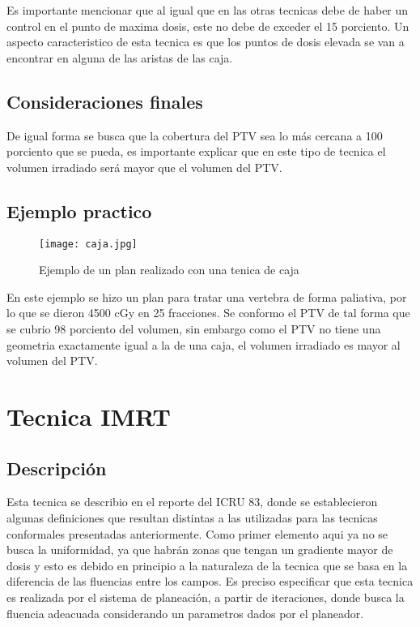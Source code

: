 \documentclass{article}
\begin{document}
\vspace{10pt}

Es importante mencionar que al igual que en las otras tecnicas debe de haber un control en el punto de maxima dosis, este no debe de exceder el 15 porciento. Un aspecto caracteristico de esta tecnica es que los puntos de dosis elevada se van a encontrar en alguna de las aristas de las caja.


\subsection{Consideraciones finales}


De igual forma se busca que la cobertura del PTV sea lo más cercana a 100 porciento que se pueda, es importante explicar que en este tipo de tecnica el volumen irradiado será mayor que el volumen del PTV. 

\subsection{Ejemplo practico}

\begin{figure}[h!]
    \centering
    \texttt{[image: caja.jpg]}
    \caption{Ejemplo de un plan realizado con una tenica de caja}
    \label{a4}
\end{figure}


En este ejemplo se hizo un plan para tratar una vertebra de forma paliativa, por lo que se dieron 4500 cGy en 25 fracciones. Se conformo el PTV de tal forma que se cubrio 98 porciento del volumen, sin embargo como el PTV no tiene una geometria exactamente igual a la de una caja, el volumen irradiado es mayor al volumen del PTV.


\section{Tecnica IMRT}

\subsection{Descripción}

Esta tecnica se describio en el reporte del ICRU 83, donde se establecieron algunas definiciones que resultan distintas a las utilizadas para las tecnicas conformales presentadas anteriormente. Como primer elemento aqui ya no se busca la uniformidad, ya que habrán zonas que tengan un gradiente mayor de dosis y esto es debido en principio a la naturaleza de la tecnica que se basa en la diferencia de las fluencias entre los campos. Es preciso especificar que esta tecnica es realizada por el sistema de planeación, a partir de iteraciones, donde busca la fluencia adeacuada considerando un parametros dados por el planeador.
\end{document}
